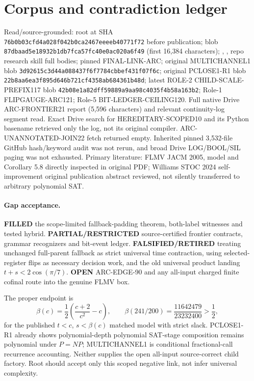 \documentclass[11pt]{article}
\begin{document}
\section{Corpus and contradiction ledger}
Read/source-grounded: root  at SHA \texttt{76b0b03cfd4a028f042b0ca2467eeeeb40771f72} before publication;  blob \texttt{87dbaad5e18932b1db7fca57fc40e0ac020a6f49} (first 16,384 characters); , , repo research skill full bodies; pinned FINAL-LINK-ARC; original MULTICHANNEL1 blob \texttt{3d92615c3d44a088437f6f7784cbbef431f07f6c}; original PCLOSE1-R1 blob \texttt{22b8aa6ea3f895d646b721cf4358ab684361b48d}; latest ROLE-2 CHILD-SCALE-PREFIX117 blob \texttt{42b08e1a82dff59889a9aa98c4035f4b58a163b2}; Role-1 FLIPGAUGE-ARC121; Role-5 BIT-LEDGER-CEILING120. Full native Drive ARC-FRONTIER21 report (5,596 characters) and relevant continuity-log segment read. Exact Drive search for HEREDITARY-SCOPED10 and its Python basename retrieved only the log, not its original compiler. ARC-UNANNOTATED-JOIN22 fetch returned empty. Inherited pinned 3,532-file GitHub hash/keyword audit was not rerun, and broad Drive LOG/BOOL/SIL paging was not exhausted. Primary literature: FLMV JACM 2005, model and Corollary 5.8 directly inspected in original PDF; Williams STOC 2024 self-improvement original publication abstract reviewed, not silently transferred to arbitrary polynomial SAT.

\paragraph{Gap acceptance.}
\textbf{FILLED} the scope-limited fallback-padding theorem, both-label witnesses and tested hybrid. \textbf{PARTIAL/RESTRICTED} source-certified frontier contracts, grammar recognizers and bit-event ledger. \textbf{FALSIFIED/RETIRED} treating unchanged full-parent fallback as strict universal time contraction, using selected-register flips as necessary decision work, and the old universal product landing $t+s<2\cos(\pi/7)$. \textbf{OPEN} ARC-EDGE-90 and any all-input charged finite cofinal route into the genuine FLMV box.

The proper endpoint is
\[
\beta(c)=\frac12\left(\frac{c+2}{c^2}-c\right),\qquad
\beta(241/200)=\frac{11642479}{23232400}>\frac12,
\]
for the published $t<c$, $s<\beta(c)$ matched model with strict slack. PCLOSE1-R1 already shows polynomial-depth polynomial SAT-stage composition remains polynomial under $P=NP$; MULTICHANNEL1 is conditional fractional-call recurrence accounting. Neither supplies the open all-input source-correct child factory. Root  should accept only this scoped negative link, not infer universal complexity.
\end{document}

